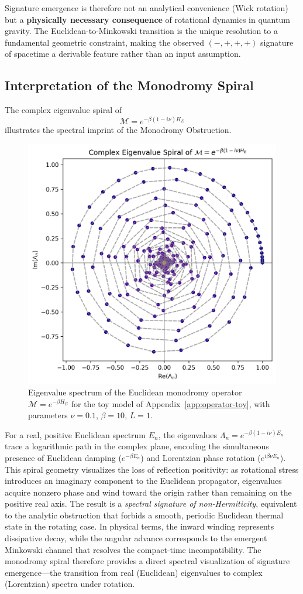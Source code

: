 \documentclass[11pt]{article}
\begin{document}
Signature emergence is therefore not an analytical convenience (Wick rotation) but 
a \textbf{physically necessary consequence} of rotational dynamics in quantum gravity. 
The Euclidean-to-Minkowski transition is the unique resolution to a fundamental 
geometric constraint, making the observed $(-,+,+,+)$ signature of spacetime a 
derivable feature rather than an input assumption.

\subsection*{Interpretation of the Monodromy Spiral}

The complex eigenvalue spiral of
\[
\mathcal{M} = e^{-\beta (1 - i\nu) H_E}
\]
illustrates the spectral imprint of the Monodromy Obstruction.

\begin{figure}[h!]
    \centering
    \includegraphics[width=0.6\linewidth]{monodromy_spiral.png}
    \caption{Eigenvalue spectrum of the Euclidean monodromy operator 
    $\mathcal{M} = e^{-\beta H_E}$ for the toy model of 
    Appendix~\ref{app:operator-toy}, with parameters 
    $\nu = 0.1$, $\beta = 10$, $L = 1$.}
    \label{fig:monodromy_spiral}
\end{figure}

For a real, positive Euclidean spectrum \(E_n\), the eigenvalues
\(\Lambda_n = e^{-\beta(1 - i\nu)E_n}\)
trace a logarithmic path in the complex plane, encoding the simultaneous presence of Euclidean damping (\(e^{-\beta E_n}\)) and Lorentzian phase rotation (\(e^{i\beta\nu E_n}\)).
This spiral geometry visualizes the loss of reflection positivity: as rotational stress introduces an imaginary component to the Euclidean propagator, eigenvalues acquire nonzero phase and wind toward the origin rather than remaining on the positive real axis.
The result is a \emph{spectral signature of non-Hermiticity}, equivalent to the analytic obstruction that forbids a smooth, periodic Euclidean thermal state in the rotating case.
In physical terms, the inward winding represents dissipative decay, while the angular advance corresponds to the emergent Minkowski channel that resolves the compact-time incompatibility.
The monodromy spiral therefore provides a direct spectral visualization of signature emergence—the transition from real (Euclidean) eigenvalues to complex (Lorentzian) spectra under rotation.
\end{document}
